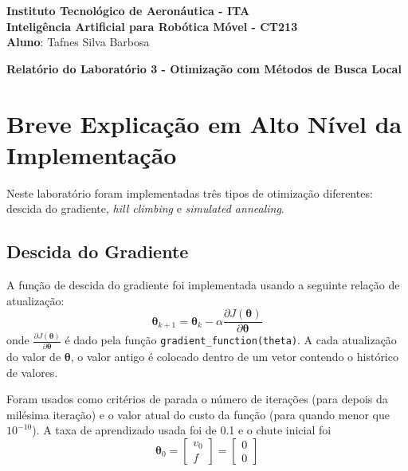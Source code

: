 \documentclass[brazil, 12pt]{article}
\begin{document}
\begin{center}
\textbf{Instituto Tecnológico de Aeronáutica - ITA} \\
\textbf{Inteligência Artificial para Robótica Móvel - CT213} \\
\textbf{Aluno}: Tafnes Silva Barbosa     %
\end{center}

\begin{center}
\textbf{Relatório do Laboratório 3 - Otimização com Métodos de Busca Local}
\end{center}
\vspace*{0.5cm}

\section{Breve Explicação em Alto Nível da Implementação}
Neste laboratório foram implementadas três tipos de otimização diferentes: descida do gradiente, \textit{hill climbing} e \textit{simulated annealing}.

\subsection{Descida do Gradiente}
A função de descida do gradiente foi implementada usando a seguinte relação de atualização:
\begin{equation}
	\boldsymbol{\theta}_{k+1}=\boldsymbol{\theta}_{k} - \alpha\frac{\partial J(\boldsymbol{\theta})}{\partial \boldsymbol{\theta}}
\end{equation}onde $\frac{\partial J(\boldsymbol{\theta})}{\partial \boldsymbol{\theta}}$ é dado pela função \texttt{gradient\_function(theta)}. A cada atualização do valor de $\boldsymbol{\theta}$, o valor antigo é colocado dentro de um vetor contendo o histórico de valores.

Foram usados como critérios de parada o número de iterações (para depois da milésima iteração) e o valor atual do custo da função (para quando menor que $10^{-10}$). A taxa de aprendizado usada foi de 0.1 e o chute inicial foi $$\boldsymbol{\theta}_{0}=\left[\begin{array}{c}
	v_{0}\\
	f
\end{array}\right]=\left[\begin{array}{c}
0\\
0
\end{array}\right]$$
\end{document}
